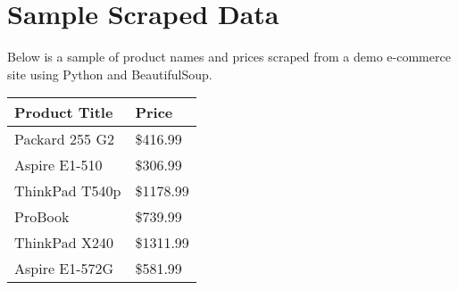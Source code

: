 \documentclass[10pt,a4paper]{article}
\begin{document}
\section*{Sample Scraped Data}
Below is a sample of product names and prices scraped from a demo e-commerce site using Python and BeautifulSoup.

\begin{tabular}{ll}
\toprule
\textbf{Product Title} & \textbf{Price} \\
\midrule
Packard 255 G2 & \$416.99 \\
Aspire E1-510 & \$306.99 \\
ThinkPad T540p & \$1178.99 \\
ProBook & \$739.99 \\
ThinkPad X240 & \$1311.99 \\
Aspire E1-572G & \$581.99 \\
\bottomrule
\end{tabular}
\end{document}
